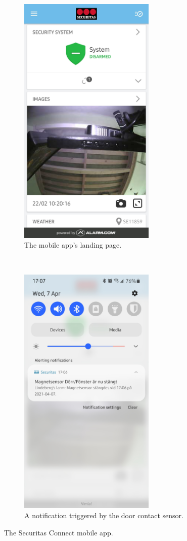 \begin{figure}[!ht]
    \centering
    \begin{subfigure}[t]{0.5\textwidth}
        \includegraphics[height=4.8in]{images/3-system/mobile-landing-page.png}
        \caption{The mobile app's landing page.}
        \label{fig:mobile-landing-page}
    \end{subfigure}%
    ~
    \begin{subfigure}[t]{0.5\textwidth}
        \includegraphics[height=4.8in]{images/3-system/mobile-notification.png}
        \caption{A notification triggered by the door contact sensor.}
        \label{fig:mobile-notification}
    \end{subfigure}
    \caption{The Securitas Connect mobile app.}
    \label{fig:mobile-application}
\end{figure}

